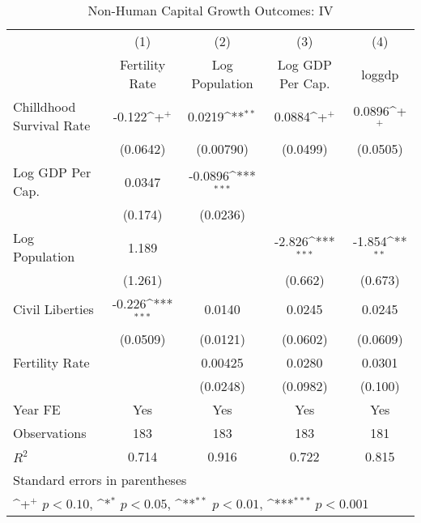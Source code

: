 \begin{table}[htbp]\centering
\def\sym#1{\ifmmode^{#1}\else\(^{#1}\)\fi}
\caption{Non-Human Capital Growth Outcomes: IV}
\begin{tabular}{l*{4}{c}}
\toprule
                &\multicolumn{1}{c}{(1)}&\multicolumn{1}{c}{(2)}&\multicolumn{1}{c}{(3)}&\multicolumn{1}{c}{(4)}\\
                &\multicolumn{1}{c}{Fertility Rate}&\multicolumn{1}{c}{Log Population}&\multicolumn{1}{c}{Log GDP Per Cap.}&\multicolumn{1}{c}{loggdp}\\
\midrule
Chilldhood Survival Rate&   -0.122\sym{+}  &   0.0219\sym{**} &   0.0884\sym{+}  &   0.0896\sym{+}  \\
                & (0.0642)         &(0.00790)         & (0.0499)         & (0.0505)         \\
\addlinespace
Log GDP Per Cap.&   0.0347         &  -0.0896\sym{***}&                  &                  \\
                &  (0.174)         & (0.0236)         &                  &                  \\
\addlinespace
Log Population  &    1.189         &                  &   -2.826\sym{***}&   -1.854\sym{**} \\
                &  (1.261)         &                  &  (0.662)         &  (0.673)         \\
\addlinespace
Civil Liberties &   -0.226\sym{***}&   0.0140         &   0.0245         &   0.0245         \\
                & (0.0509)         & (0.0121)         & (0.0602)         & (0.0609)         \\
\addlinespace
Fertility Rate  &                  &  0.00425         &   0.0280         &   0.0301         \\
                &                  & (0.0248)         & (0.0982)         &  (0.100)         \\
\addlinespace
Year FE         &      Yes         &      Yes         &      Yes         &      Yes         \\
\midrule
Observations    &      183         &      183         &      183         &      181         \\
\(R^{2}\)       &    0.714         &    0.916         &    0.722         &    0.815         \\
\bottomrule
\multicolumn{5}{l}{\footnotesize Standard errors in parentheses}\\
\multicolumn{5}{l}{\footnotesize \sym{+} \(p<0.10\), \sym{*} \(p<0.05\), \sym{**} \(p<0.01\), \sym{***} \(p<0.001\)}\\
\end{tabular}
\end{table}
